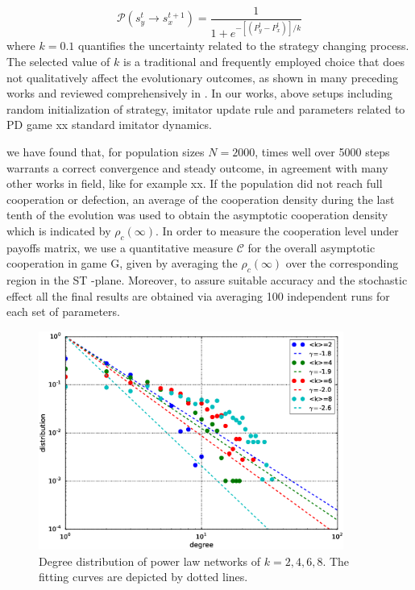 \documentclass[preprint,12pt,3p]{elsarticle}
\begin{document}
\begin{equation}
\mathcal{P}(s_y^t\rightarrow s_x^{t+1})=\frac{1}{1+e^{-[(P_y^t-P_x^t)]/k}}
\end{equation}
where $k=0.1$ quantifies the uncertainty related to the strategy changing process.
The selected value of $k$ is a traditional and frequently employed choice that does
not qualitatively affect the evolutionary outcomes, as shown in many preceding
works and reviewed comprehensively in \cite{szabo2007evolutionary,wang2014degree}.
In our works, above setups including random initialization of strategy, imitator update rule and parameters
related to PD game xx standard imitator dynamics.

we have found that, for population sizes $N=2000$, times well over 5000 steps
warrants a correct convergence and steady outcome, in agreement with many other works in field, like for example xx.
If the population did not reach full cooperation or defection,
an average of the cooperation density during the last tenth of the evolution was used to obtain
the asymptotic cooperation density which is indicated by $\rho_{c}(\infty)$.
In order to measure the cooperation level under payoffs matrix, we use a quantitative measure  $\mathcal{C}$
for the overall asymptotic cooperation in game G, given by averaging the $\rho_{c}(\infty)$
over the corresponding region in the ST -plane.
Moreover, to assure suitable accuracy and the stochastic effect all the final results are obtained
via averaging 100 independent runs for each set of parameters.

\begin{figure}
  \centering
  \includegraphics[width=10cm]{powerlaw_degree_dist.eps}
  \caption{Degree distribution of power law networks of $k=2,4,6,8$.
  The fitting curves are depicted by dotted lines.}
  \label{fig_degree}
\end{figure}
\end{document}
